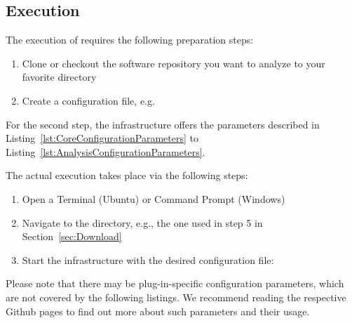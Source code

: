 \subsection{Execution}
\label{sec:Execution}
The execution of \thetool{} requires the following preparation steps:
\begin{enumerate}
	\item Clone or checkout the software repository you want to analyze to your favorite directory
	\item Create a \thetool{} configuration file, e.g. 
\end{enumerate}
For the second step, the infrastructure offers the parameters described in Listing~\ref{lst:CoreConfigurationParameters} to Listing~\ref{lst:AnalysisConfigurationParameters}.
\begin{figure}[ht]
	\centering
		
\end{figure}
\begin{figure}[ht]
	\centering
		
\end{figure}
\begin{figure}[ht]
	\centering
		
\end{figure}

The actual execution takes place via the following steps:
\begin{enumerate}
	\item Open a Terminal (Ubuntu) or Command Prompt (Windows)
	\item Navigate to the \thetool{} directory, e.g., the one used in step 5 in Section~\ref{sec:Download}
	\item Start the infrastructure with the desired configuration file: 
\end{enumerate}

Please note that there may be plug-in-specific configuration parameters, which are not covered by the following listings.
We recommend reading the respective Github pages to find out more about such parameters and their usage.